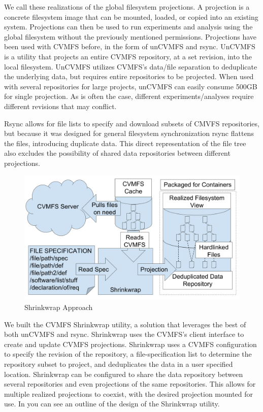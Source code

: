 \documentclass[sigconf]{acmart}
\begin{document}
We call these realizations of the global filesystem
projections.
A projection is a concrete filesystem image that can be
mounted, loaded, or copied into an existing system.
Projections can then be used to run experiments
and analysis using the global filesystem without
the previously mentioned permissions.
Projections have been used with CVMFS before,
in the form of unCVMFS and rsync.
UnCVMFS is a utility that projects an entire
CVMFS repository, at a set revision, into the local
filesystem. 
UnCVMFS utilizes CVMFS's data/file separation
to deduplicate the underlying data, but requires
entire repositories to be projected.
When used with several repositories for large projects,
unCVMFS can easily consume 500GB for single projection.
As is often the case, different experiments/analyses 
require different revisions that may conflict.

Rsync allows for file lists to specify and download
subsets of CMVFS repositories, but because it
was designed for general filesystem synchronization
rsync flattens the files, introducing duplicate data.
This direct representation of the file tree also
excludes the possibility of shared data repositories
between different projections.


\begin{figure}[h]
\includegraphics[width=\columnwidth]{drawings/shrinkwrap-structure.png}
\caption{Shrinkwrap Approach}
\label{figure:shrinkwrap-arch}
\end{figure}

We built the CVMFS Shrinkwrap utility,
a solution that leverages the best of both
unCVMFS and rsync.
Shrinkwrap uses the CVMFS's client interface to
create and update CVMFS projections.
Shrinkwrap uses a CVMFS configuration to specify the
revision of the repository, a file-specification list
to determine the repository subset to project, and
deduplicates the data in a user specified location.
Shrinkwrap can be configured to share the data
repository between several repositories and even
projections of the same repositories.
This allows for multiple realized projections
to coexist, with the desired projection
mounted for use.
In  you can see an outline
of the design of the Shrinkwrap utility.
\end{document}
